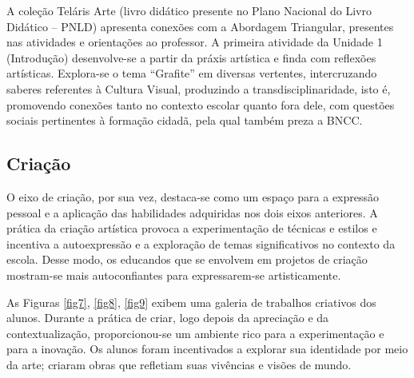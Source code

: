 \documentclass[portuguese]{textolivre}
\begin{document}


A coleção Teláris Arte (livro didático presente no Plano Nacional do Livro Didático – PNLD) apresenta conexões com a Abordagem Triangular, presentes nas atividades e orientações ao professor. A primeira atividade da Unidade 1 (Introdução) desenvolve-se a partir da práxis artística e finda com reflexões artísticas. Explora-se o tema “Grafite” em diversas vertentes, intercruzando saberes referentes à Cultura Visual, produzindo a transdisciplinaridade, isto é, promovendo conexões tanto no contexto escolar quanto fora dele, com questões sociais pertinentes à formação cidadã, pela qual também preza a BNCC.

\subsection{Criação}\label{sec-organizacao}
O eixo de criação, por sua vez, destaca-se como um espaço para a expressão pessoal e a aplicação das habilidades adquiridas nos dois eixos anteriores. A prática da criação artística provoca a experimentação de técnicas e estilos e incentiva a autoexpressão e a exploração de temas significativos no contexto da escola. Desse modo, os educandos que se envolvem em projetos de criação mostram-se mais autoconfiantes para expressarem-se artisticamente.

As Figuras \ref{fig7}, \ref{fig8}, \ref{fig9} exibem uma galeria de trabalhos criativos dos alunos. Durante a prática de criar, logo depois da apreciação e da contextualização, proporcionou-se um ambiente rico para a experimentação e para a inovação. Os alunos foram incentivados a explorar sua identidade por meio da arte; criaram obras que refletiam suas vivências e visões de mundo.
\end{document}
